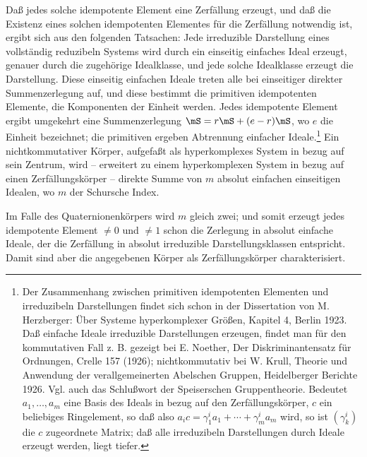 Daß jedes solche idempotente Element eine Zerfällung erzeugt, und daß die Existenz eines solchen idempotenten Elementes für die Zerfällung notwendig ist, ergibt sich aus den folgenden Tatsachen: Jede irreduzible Darstellung eines vollständig reduzibeln Systems wird durch ein einseitig einfaches Ideal erzeugt, genauer durch die zugehörige Idealklasse, und jede solche Idealklasse erzeugt die Darstellung. Diese einseitig einfachen Ideale treten alle bei einseitiger direkter Summenzerlegung auf, und diese bestimmt die \guillemotright{}primitiven\guillemotleft{} idempotenten Elemente, die Komponenten der Einheit werden. Jedes idempotente Element ergibt umgekehrt eine Summenzerlegung $\mS=r\mS+(e-r)\mS$, wo $e$ die Einheit bezeichnet; die \guillemotright{}primitiven\guillemotleft{} ergeben Abtrennung einfacher Ideale.\footnote{Der Zusammenhang zwischen primitiven idempotenten Elementen und irreduzibeln Darstellungen findet sich schon in der Dissertation von M. Herzberger: Über Systeme hyperkomplexer Größen, Kapitel 4, Berlin 1923. Daß einfache Ideale irreduzible Darstellungen erzeugen, findet man für den kommutativen Fall z. B. gezeigt bei E. Noether, Der Diskriminantensatz für Ordnungen, Crelle 157 (1926); nichtkommutativ bei W. Krull, Theorie und Anwendung der verallgemeinerten Abelschen Gruppen, Heidelberger Berichte 1926. Vgl. auch das Schlußwort der Speiserschen Gruppentheorie. Bedeutet $a_1,\ldots,a_m$ eine Basis des Ideals in bezug auf den Zerfällungskörper, $c$ ein beliebiges Ringelement, so daß also $a_i c=\gamma^i_1 a_1+\cdots+\gamma^i_m a_m$ wird, so ist $(\gamma^i_k)$ die $c$ zugeordnete Matrix; daß alle irreduzibeln Darstellungen durch Ideale erzeugt werden, liegt tiefer.} Ein nichtkommutativer Körper, aufgefaßt als hyperkomplexes System in bezug auf sein Zentrum, wird -- erweitert zu einem hyperkomplexen System in bezug auf einen Zerfällungskörper -- direkte Summe von $m$ absolut einfachen einseitigen Idealen, wo $m$ der Schursche Index.

Im Falle des Quaternionenkörpers wird $m$ gleich zwei; und somit erzeugt jedes idempotente Element $\ne0$ und $\ne1$ schon die Zerlegung in absolut einfache Ideale, der die Zerfällung in absolut irreduzible Darstellungsklassen entspricht. Damit sind aber die angegebenen Körper als Zerfällungskörper charakterisiert.
